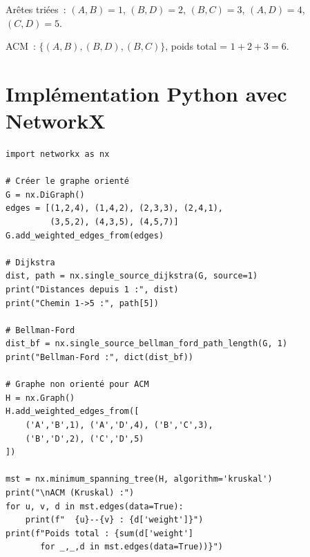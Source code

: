 \begin{exemple}
\begin{center}
\end{center}

Ar\^etes tri\'ees~: $(A,B)=1$, $(B,D)=2$, $(B,C)=3$, $(A,D)=4$, $(C,D)=5$.

ACM~: $\{(A,B), (B,D), (B,C)\}$, poids total = $1 + 2 + 3 = 6$.
\end{exemple}

\section{Impl\'ementation Python avec NetworkX}

\begin{codeblock}[title=\textbf{Plus court chemin et ACM}]
\begin{verbatim}
import networkx as nx

# Créer le graphe orienté
G = nx.DiGraph()
edges = [(1,2,4), (1,4,2), (2,3,3), (2,4,1),
         (3,5,2), (4,3,5), (4,5,7)]
G.add_weighted_edges_from(edges)

# Dijkstra
dist, path = nx.single_source_dijkstra(G, source=1)
print("Distances depuis 1 :", dist)
print("Chemin 1->5 :", path[5])

# Bellman-Ford
dist_bf = nx.single_source_bellman_ford_path_length(G, 1)
print("Bellman-Ford :", dict(dist_bf))

# Graphe non orienté pour ACM
H = nx.Graph()
H.add_weighted_edges_from([
    ('A','B',1), ('A','D',4), ('B','C',3),
    ('B','D',2), ('C','D',5)
])

mst = nx.minimum_spanning_tree(H, algorithm='kruskal')
print("\nACM (Kruskal) :")
for u, v, d in mst.edges(data=True):
    print(f"  {u}--{v} : {d['weight']}")
print(f"Poids total : {sum(d['weight']
       for _,_,d in mst.edges(data=True))}")
\end{verbatim}
\end{codeblock}

